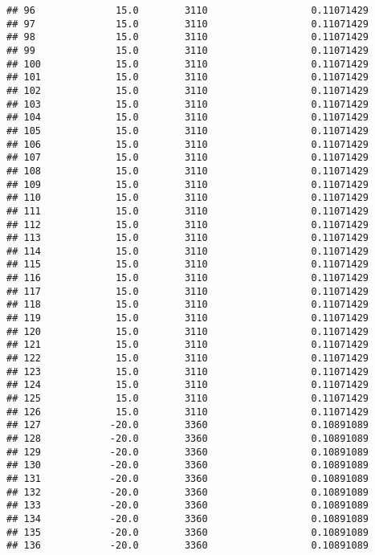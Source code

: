 \documentclass[]{article}
\begin{document}
\begin{verbatim}
## 96              15.0        3110                  0.11071429
## 97              15.0        3110                  0.11071429
## 98              15.0        3110                  0.11071429
## 99              15.0        3110                  0.11071429
## 100             15.0        3110                  0.11071429
## 101             15.0        3110                  0.11071429
## 102             15.0        3110                  0.11071429
## 103             15.0        3110                  0.11071429
## 104             15.0        3110                  0.11071429
## 105             15.0        3110                  0.11071429
## 106             15.0        3110                  0.11071429
## 107             15.0        3110                  0.11071429
## 108             15.0        3110                  0.11071429
## 109             15.0        3110                  0.11071429
## 110             15.0        3110                  0.11071429
## 111             15.0        3110                  0.11071429
## 112             15.0        3110                  0.11071429
## 113             15.0        3110                  0.11071429
## 114             15.0        3110                  0.11071429
## 115             15.0        3110                  0.11071429
## 116             15.0        3110                  0.11071429
## 117             15.0        3110                  0.11071429
## 118             15.0        3110                  0.11071429
## 119             15.0        3110                  0.11071429
## 120             15.0        3110                  0.11071429
## 121             15.0        3110                  0.11071429
## 122             15.0        3110                  0.11071429
## 123             15.0        3110                  0.11071429
## 124             15.0        3110                  0.11071429
## 125             15.0        3110                  0.11071429
## 126             15.0        3110                  0.11071429
## 127            -20.0        3360                  0.10891089
## 128            -20.0        3360                  0.10891089
## 129            -20.0        3360                  0.10891089
## 130            -20.0        3360                  0.10891089
## 131            -20.0        3360                  0.10891089
## 132            -20.0        3360                  0.10891089
## 133            -20.0        3360                  0.10891089
## 134            -20.0        3360                  0.10891089
## 135            -20.0        3360                  0.10891089
## 136            -20.0        3360                  0.10891089

\end{verbatim}
\end{document}
